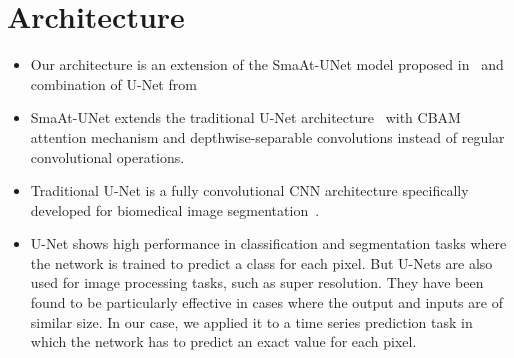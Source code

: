\documentclass[a4paper,11pt,oneside]{report}
\begin{document}
\section{Architecture}\label{sec:model}
\begin{itemize}
    \item Our architecture is an extension of the SmaAt-UNet model proposed in~\cite{smatunet} and combination of U-Net from~\cite{Doury}
     \item SmaAt-UNet extends the traditional U-Net architecture~\cite{unet} with CBAM attention mechanism and depthwise-separable convolutions instead of regular convolutional operations. 
    \item Traditional U-Net is a fully convolutional CNN architecture specifically developed for biomedical image segmentation~\cite{Ronneberger2015}. 
    \item U-Net shows high performance in classification and segmentation tasks where the network is trained to predict a class for each pixel. But U-Nets are also used for image processing tasks, such as super resolution. They have been found to be particularly effective in cases where the output and inputs are of similar size. In our case, we applied it to a time series prediction task in which the network has to predict an exact value for each pixel.


\end{itemize}
\end{document}
